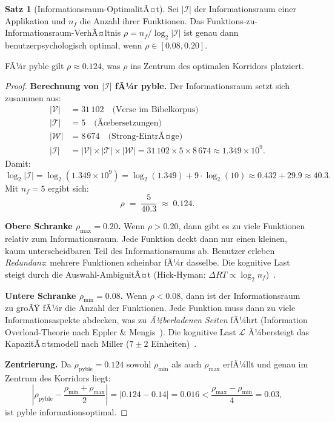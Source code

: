 ﻿\documentclass[a4paper,12pt]{article}
\theoremstyle{definition}
\newtheorem{satz}{Satz}
\begin{document}
\begin{satz}[Informationsraum-OptimalitÃ¤t]
\label{satz:inforaum}
    Sei $|\mathcal{I}|$ der Informationsraum einer Applikation und $n_f$ die
    Anzahl ihrer Funktionen. Das Funktions-zu-Informationsraum-VerhÃ¤ltnis
    $\rho = n_f / \log_2 |\mathcal{I}|$ ist genau dann benutzerpsychologisch
    optimal, wenn $\rho \in [0.08, 0.20]$.

    FÃ¼r pyble gilt $\rho \approx 0.124$, was $\rho$ ins Zentrum des optimalen
    Korridors platziert.
\end{satz}

\begin{proof}
    \textbf{Berechnung von $|\mathcal{I}|$ fÃ¼r pyble.}
    Der Informationsraum setzt sich zusammen aus:
    \begin{align*}
        |\mathcal{V}|  &= 31\,102 \quad \text{(Verse im Bibelkorpus)} \\
        |\mathcal{T}|  &= 5      \quad \text{(Ãœbersetzungen)} \\
        |\mathcal{W}|  &= 8\,674 \quad \text{(Strong-EintrÃ¤ge)} \\
        |\mathcal{I}|  &= |\mathcal{V}| \times |\mathcal{T}| \times |\mathcal{W}|
                         = 31\,102 \times 5 \times 8\,674
                        \approx 1.349 \times 10^9.
    \end{align*}
    Damit:
    \[
        \log_2 |\mathcal{I}| = \log_2(1.349 \times 10^9)
        = \log_2(1.349) + 9 \cdot \log_2(10)
        \approx 0.432 + 29.9 \approx 40.3.
    \]
    Mit $n_f = 5$ ergibt sich:
    \[
        \rho \;=\; \frac{5}{40.3} \;\approx\; 0.124.
    \]

    \textbf{Obere Schranke $\rho_{\max} = 0.20$.}
    Wenn $\rho > 0.20$, dann gibt es zu viele Funktionen relativ zum Informationsraum.
    Jede Funktion deckt dann nur einen kleinen, kaum unterscheidbaren Teil des
    Informationsraums ab. Benutzer erleben \emph{Redundanz}: mehrere Funktionen
    scheinbar fÃ¼r dasselbe. Die kognitive Last steigt durch die Auswahl-AmbiguitÃ¤t
    (Hick-Hyman: $\Delta RT \propto \log_2 n_f$)~\cite{hick1952}.

    \textbf{Untere Schranke $\rho_{\min} = 0.08$.}
    Wenn $\rho < 0.08$, dann ist der Informationsraum zu groÃŸ fÃ¼r die Anzahl der
    Funktionen. Jede Funktion muss dann zu viele Informationsaspekte abdecken,
    was zu \emph{Ã¼berladenen Seiten} fÃ¼hrt (Information Overload-Theorie nach
    Eppler \& Mengis~\cite{eppler2004}). Die kognitive Last $\mathcal{L}$ Ã¼bersteigt
    das KapazitÃ¤tsmodell nach Miller ($7 \pm 2$ Einheiten)~\cite{miller1956}.

    \textbf{Zentrierung.}
    Da $\rho_{\text{pyble}} = 0.124$ sowohl $\rho_{\min}$ als auch $\rho_{\max}$
    erfÃ¼llt und genau im Zentrum des Korridors liegt:
    \[
        \left| \rho_{\text{pyble}} - \frac{\rho_{\min} + \rho_{\max}}{2} \right|
        = \left| 0.124 - 0.14 \right| = 0.016 < \frac{\rho_{\max} - \rho_{\min}}{4} = 0.03,
    \]
    ist pyble informationsoptimal.
\end{proof}
\end{document}
